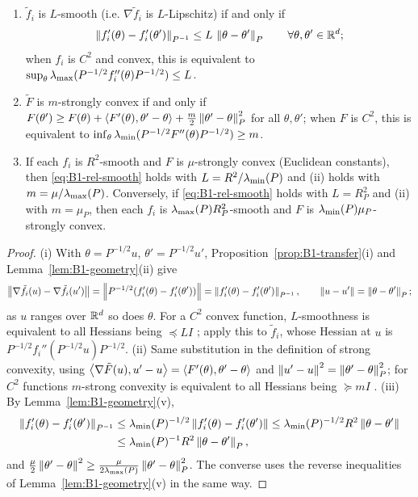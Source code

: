 \begin{lemma}\label{lem:B1-constants}
\begin{enumerate}[label=(\roman*)]
\item $\tilde f_i$ is $L$-smooth (i.e. $\nabla\tilde f_i$ is $L$-Lipschitz) if and only if
\begin{equation}\label{eq:B1-rel-smooth}
\left\|f'_i(\theta)-f'_i(\theta')\right\|_{P^{-1}}\le L\,\left\|\theta-\theta'\right\|_P\qquad\forall\theta,\theta'\in\mathbb{R}^d ;
\end{equation}
when $f_i$ is $C^2$ and convex, this is equivalent to $\sup_{\theta}\lambda_{\max}(P^{-1/2}f_i''(\theta)P^{-1/2})\le L$.
\item $\tilde F$ is $m$-strongly convex if and only if
$F(\theta')\ge F(\theta)+\left\langle F'(\theta), \theta'-\theta \right\rangle+\frac m2\left\|\theta'-\theta\right\|_P^2$ for all
$\theta,\theta'$; when $F$ is $C^2$, this is equivalent to $\inf_\theta\lambda_{\min}(P^{-1/2}F''(\theta)P^{-1/2})\ge m$.
\item If each $f_i$ is $R^2$-smooth and $F$ is $\mu$-strongly convex (Euclidean constants), then
\eqref{eq:B1-rel-smooth} holds with $L=R^2/\lambda_{\min}(P)$ and (ii) holds with $m=\mu/\lambda_{\max}(P)$. Conversely, if
\eqref{eq:B1-rel-smooth} holds with $L=R_P^2$ and (ii) with $m=\mu_P$, then each $f_i$ is
$\lambda_{\max}(P)R_P^2$-smooth and $F$ is $\lambda_{\min}(P)\mu_P$-strongly convex.
\end{enumerate}
\end{lemma}
\begin{proof}
(i) With $\theta=P^{-1/2}u$, $\theta'=P^{-1/2}u'$, Proposition~\ref{prop:B1-transfer}(i) and
Lemma~\ref{lem:B1-geometry}(ii) give
\[
\left\|\nabla\tilde f_i(u)-\nabla\tilde f_i(u')\right\|=\left\|P^{-1/2}(f'_i(\theta)-f'_i(\theta'))\right\|
=\left\|f'_i(\theta)-f'_i(\theta')\right\|_{P^{-1}},\qquad \left\|u-u'\right\|=\left\|\theta-\theta'\right\|_P ;
\]
as $u$ ranges over $\mathbb{R}^d$ so does $\theta$. For a $C^2$ convex function, $L$-smoothness is equivalent to all Hessians being
$\preceq LI$ \cite[Def.~5.3 and Sec.~5.2]{bach2024learning}; apply this to $\tilde f_i$, whose Hessian at
$u$ is $P^{-1/2}f_i''(P^{-1/2}u)P^{-1/2}$. (ii) Same substitution in the definition of strong convexity,
using $\left\langle \nabla\tilde F(u), u'-u \right\rangle=\left\langle F'(\theta), \theta'-\theta \right\rangle$ and
$\left\|u'-u\right\|^2=\left\|\theta'-\theta\right\|_P^2$; for $C^2$ functions $m$-strong convexity is equivalent to all
Hessians being $\succeq mI$ \cite[Sec.~5.2]{bach2024learning}.
(iii) By Lemma~\ref{lem:B1-geometry}(v),
\begin{align*}
\left\|f'_i(\theta)-f'_i(\theta')\right\|_{P^{-1}}&\le\lambda_{\min}(P)^{-1/2}\left\|f'_i(\theta)-f'_i(\theta')\right\|
\le\lambda_{\min}(P)^{-1/2}R^2\left\|\theta-\theta'\right\|\\
&\le\lambda_{\min}(P)^{-1}R^2\left\|\theta-\theta'\right\|_P ,
\end{align*}
and $\frac\mu2\left\|\theta'-\theta\right\|^2\ge\frac{\mu}{2\lambda_{\max}(P)}\left\|\theta'-\theta\right\|_P^2$. The converse uses the
reverse inequalities of Lemma~\ref{lem:B1-geometry}(v) in the same way.
\end{proof}


